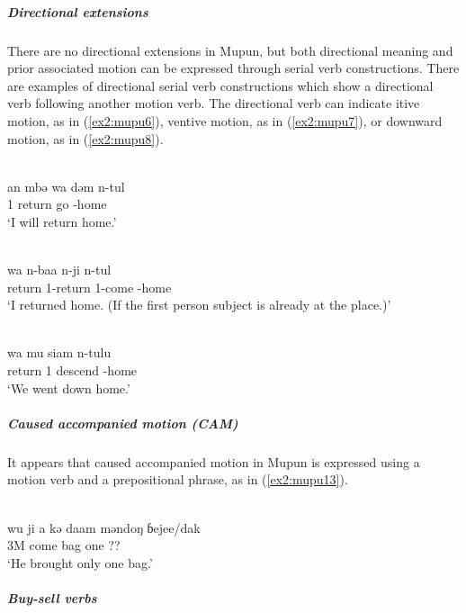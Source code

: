 \subparagraph{Directional extensions}



There are no directional extensions in Mupun, but both directional meaning and prior associated motion can be expressed through serial verb constructions. There are examples of directional serial verb constructions which show a directional verb following another motion verb. The directional verb can indicate itive motion, as in (\ref{ex2:mupu6}), ventive motion, as in (\ref{ex2:mupu7}), or downward motion, as in (\ref{ex2:mupu8}). 

\ea\label{ex2:mupu6}
 \\
\gll  an	mbə	wa	dəm	n-tul \\
1		return	go	-home \\
\glt `I will return home.'

\ex\label{ex2:mupu7}
 \\
\gll  wa	n-baa	n-ji	n-tul \\
return	1-return	1-come	-home \\
\glt `I returned home. (If the first person subject is already at the place.)'

\ex\label{ex2:mupu8}
 \\
\gll  wa	mu	siam	n-tulu \\
return	1	descend	-home \\
\glt `We went down home.'
\z 

\subparagraph{Caused accompanied motion (CAM)}



It appears that caused accompanied motion in Mupun is expressed using a motion verb and a prepositional phrase, as in (\ref{ex2:mupu13}).

\ea\label{ex2:mupu13}
 \\
\gll wu ji a kə daam məndoŋ ɓejee/dak \\
3M come   bag one ?? \\
\glt `He brought only one bag.'
\z 

\subparagraph{Buy-sell verbs}




